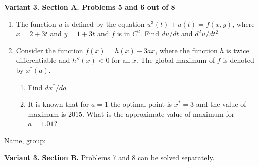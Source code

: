 \documentclass[12pt,a4paper]{article}
\begin{document}
\newpage
\textbf{Variant 3. Section A. Problems 5 and 6 out of 8}


\begin{enumerate}[resume]

\item The function $u$ is defined by the equation $u^3(t) + u(t) = f(x,y)$, where $x=2+3t$ and $y=1+3t$ and $f$ is in $C^2$. Find $du/dt$ and $d^2 u/dt^2$



\item Consider the function $f(x)=h(x)-3ax$, where the function $h$ is twice differentiable and $h''(x)<0$ for all $x$. The global maximum of $f$ is denoted by $x^*(a)$.
\begin{enumerate}
\item Find $dx^*/da$
\item It is known that for $a=1$ the optimal point is $x^*=3$ and the value of maximum is $2015$. What is the approximate value of maximum for $a=1.01$?
\end{enumerate}

\end{enumerate}

\begin{framed}
\begin{minipage}{42em}
Name, group:\vspace*{3ex}\par 
\noindent\dotfill
\end{minipage}
\end{framed}



\newpage
\textbf{Variant 3. Section B.} Problems 7 and 8 can be solved separately.
\end{document}
